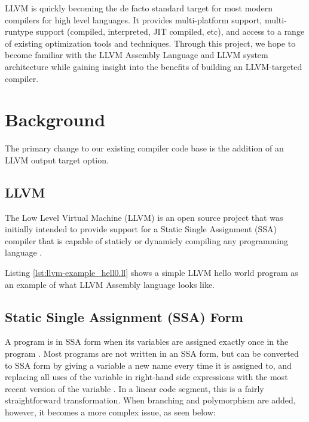 \documentclass[11pt]{article}
\begin{document}
LLVM is quickly becoming the de facto standard target for most modern
compilers for high level languages.  It provides multi-platform
support, multi-runtype support (compiled, interpreted, JIT compiled,
etc), and access to a range of existing optimization tools and
techniques. Through this project, we hope to become familiar with the
LLVM Assembly Language and LLVM system architecture while gaining
insight into the benefits of building an LLVM-targeted compiler.

\section{Background}

The primary change to our existing compiler code base is the addition
of an LLVM output target option.

\subsection{LLVM}

The Low Level Virtual Machine (LLVM) is an open source project that
was initially intended to provide support for a Static Single
Assignment (SSA) compiler that is capable of staticly or dynamicly
compiling any programming language \cite{llvm.org}.

Listing \ref{lst:llvm-example_hell0.ll} shows
a simple LLVM hello world program as an example of
what LLVM Assembly language looks like.



\subsection{Static Single Assignment (SSA) Form}

A program is in SSA form when its variables are assigned exactly once
in the program \cite{gcc-gnu.org}. Most programs are not written in an
SSA form, but can be converted to SSA form by giving a variable a new
name every time it is assigned to, and replacing all uses of the
variable in right-hand side expressions with the most recent version
of the variable \cite{brandis-mossenbock}. In a linear code segment,
this is a fairly straightforward transformation. When branching and
polymorphism are added, however, it becomes a more complex issue, as
seen below:
\end{document}
